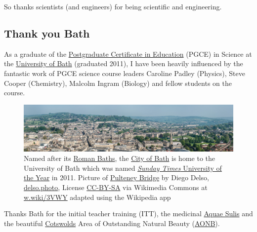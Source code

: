 \documentclass[
]{book}
\begin{document}
So thanks scientists (and engineers) for being scientific and engineering. 🙏

\hypertarget{bath}{%
\subsection{Thank you Bath}\label{bath}}

As a graduate of the \href{https://en.wikipedia.org/wiki/Postgraduate_Certificate_in_Education}{Postgraduate Certificate in Education} (PGCE) in Science at the \href{https://en.wikipedia.org/wiki/University_of_Bath}{University of Bath} (graduated 2011), I have been heavily influenced by the fantastic work of PGCE science course leaders Caroline Padley (Physics), Steve Cooper (Chemistry), Malcolm Ingram (Biology) and fellow students on the course.

\begin{figure}

{\centering \includegraphics[width=1\linewidth]{images/bath-panorama} 

}

\caption{Named after its \href{https://en.wikipedia.org/wiki/Roman_Baths_(Bath)}{Roman Baths}, the \href{https://en.wikipedia.org/wiki/Bath,_Somerset}{City of Bath} is home to the University of Bath which was named \href{https://en.wikipedia.org/wiki/Sunday_Times_University_of_the_Year}{\emph{Sunday Times} University of the Year} in 2011. Picture of \href{https://en.wikipedia.org/wiki/Pulteney_Bridge}{Pulteney Bridge} by Diego Delso, \href{http://delso.photo/}{delso.photo}, License \href{https://creativecommons.org/licenses/by-sa/4.0/legalcode}{CC-BY-SA} via Wikimedia Commons at \href{https://w.wiki/3VWY}{w.wiki/3VWY} adapted using the Wikipedia app}\label{fig:bath-fig}
\end{figure}



Thanks Bath for the initial teacher training (ITT), the medicinal \href{https://en.wikipedia.org/wiki/Aquae_Sulis}{Aquae Sulis} and the beautiful \href{https://en.wikipedia.org/wiki/Cotswolds}{Cotswolds} Area of Outstanding Natural Beauty (\href{https://en.wikipedia.org/wiki/Area_of_Outstanding_Natural_Beauty}{AONB}). 🙏
\end{document}
